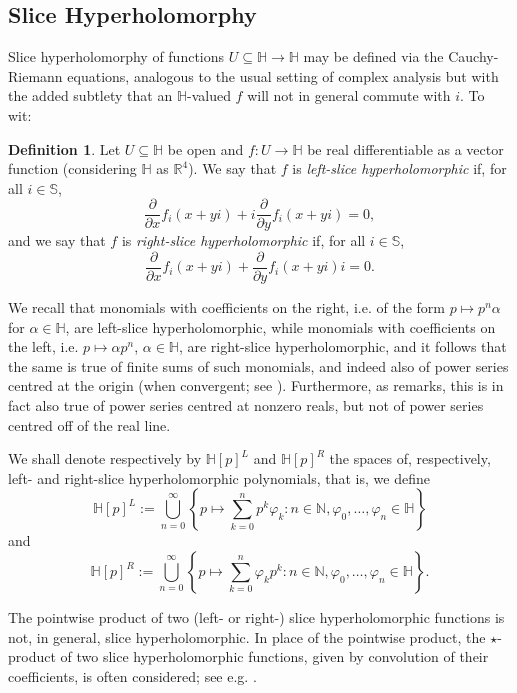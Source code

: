 \documentclass[11pt,reqno]{amsart}
\def\a{\alpha}
\def\p{\varphi}
\def\NN{\mathbb{N}}
\def\RR{\mathbb{R}}
\def\SS{\mathbb{S}}
\def\HH{\mathbb{H}}
\theoremstyle{definition}
\newtheorem{definition}[theorem]{Definition}
\numberwithin{equation}{section}
\begin{document}
\subsection{Slice Hyperholomorphy} Slice hyperholomorphy of functions \(U \subseteq \HH \to \HH\) may be defined via the Cauchy-Riemann equations, analogous to the usual setting of complex analysis but with the added subtlety that an \(\HH\)-valued \(f\) will not in general commute with \(i\). To wit: 
\begin{definition}
	Let \(U \subseteq \HH\) be open and \(f : U \to \HH\) be real differentiable as a vector function (considering \(\HH\) as \(\RR^4\)). We say that \(f\) is \emph{left-slice hyperholomorphic} if, for all \(i \in \SS\),
	\[
	    \frac{\partial}{\partial x}f_i(x + yi) + i\frac{\partial}{\partial y}f_i(x + yi) = 0,
	\]
	and we say that \(f\) is \emph{right-slice hyperholomorphic} if, for all \(i \in \SS\),
	\[
	    \frac{\partial}{\partial x}f_{i}(x + yi) + \frac{\partial}{\partial y} f_{i}(x + yi) i = 0.
	\]
\end{definition}

We recall that monomials with coefficients on the right, i.e. of the form \(p \mapsto p^n \a\) for \(\a \in \HH\), are left-slice hyperholomorphic, while monomials with coefficients on the left, i.e. \(p \mapsto \a p^n\), \(\a \in \HH\), are right-slice hyperholomorphic, and it follows that the same is true of finite sums of such monomials, and indeed also of power series centred at the origin (when convergent; see \cite{CSS11}). Furthermore, as \cite{ACKS15} remarks, this is in fact also true of power series centred at nonzero reals, but not of power series centred off of the real line.

We shall denote respectively by \(\HH[p]^L\) and \(\HH[p]^R\) the spaces of, respectively, left- and right-slice hyperholomorphic polynomials, that is, we define
\[
    \HH[p]^L := \bigcup_{n=0}^{\infty}\left\{p \mapsto \sum_{k=0}^{n} p^k \p_k : n \in \NN, \p_0, \ldots, \p_n \in \HH\right\}
\]
and
\[
    \HH[p]^R := \bigcup_{n=0}^{\infty}\left\{p \mapsto \sum_{k=0}^{n} \p_k p^k : n \in \NN, \p_0, \ldots, \p_n \in \HH\right\}.
\]

The pointwise product of two (left- or right-) slice hyperholomorphic functions is not, in general, slice hyperholomorphic. In place of the pointwise product, the \(\star\)-product of two slice hyperholomorphic functions, given by convolution of their coefficients, is often considered; see e.g. \cite{ACS16a}.
\end{document}
